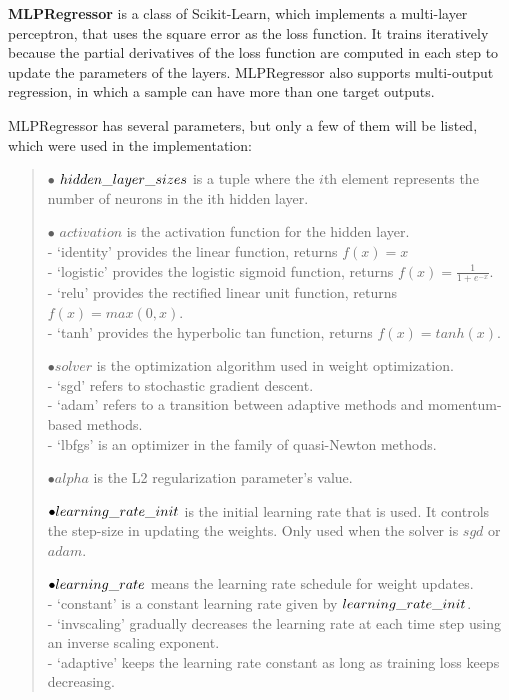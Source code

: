 \textbf{MLPRegressor} \cite{bengfort2018applied} is a class of Scikit-Learn, which implements a multi-layer perceptron, that uses the square error as the loss function. It trains iteratively because the partial derivatives of the loss function are computed in each step to update the parameters of the layers. MLPRegressor also supports multi-output regression, in which a sample can have more than one target outputs.\medskip

\noindent MLPRegressor has several parameters, but only a few of them will be listed, which were used in the implementation:
\begin{verse}
	$\bullet$ $hidden\char`_layer\char`_sizes$ is a tuple where the $i$th element represents the number of neurons in the ith hidden layer.
	
	$\bullet$ $activation$ is the activation function for the hidden layer.\\
	\hspace{10pt} - ‘identity’ provides the linear function, returns $f(x) = x$\\
	\hspace{10pt} - ‘logistic’ provides the logistic sigmoid function, returns $f(x) = \frac{1}{1 + e^{-x}}.$\\
	\hspace{10pt} - ‘relu’ provides the rectified linear unit function, returns $f(x) = max(0, x)$. \\
	\hspace{10pt} - ‘tanh’ provides the hyperbolic tan function, returns $f(x) = tanh(x)$.
	
	$\bullet solver$ is the optimization algorithm used in weight optimization.\\
	\hspace{10pt} - ‘sgd’ refers to stochastic gradient descent.\\
	\hspace{10pt} - ‘adam’ refers to a transition between adaptive methods and momentum-based methods.\\
	\hspace{10pt} - ‘lbfgs’ is an optimizer in the family of quasi-Newton methods.
	
	$\bullet alpha$ is the L2 regularization parameter's value.
	
	$\bullet learning\char`_rate\char`_init$ is the initial learning rate that is used. It controls the step-size in updating the weights. Only used when the solver is $sgd$ or $adam$.
	
	$\bullet learning\char`_rate$ means the learning rate schedule for weight updates. \\
	\hspace{10pt} - ‘constant’ is a constant learning rate given by $learning\char`_rate\char`_init$.\\
	\hspace{10pt} - ‘invscaling’ gradually decreases the learning rate at each time step using an inverse scaling exponent.\\
	\hspace{10pt} - ‘adaptive’ keeps the learning rate constant as long as training loss keeps decreasing.
\end{verse}
